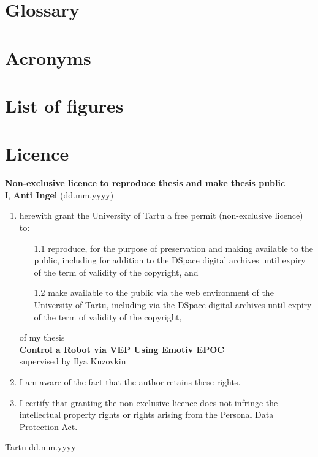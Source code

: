 
\begin{appendices}
\renewcommand{\thesection}{\Roman{section}}
\section{Glossary}
\printglossary
\newpage
\section{Acronyms}
\printglossary[type=\acronymtype]
\newpage
\section{List of figures}
\makeatletter
{}%
\makeatother
\newpage
\section{Licence}
\textbf{Non-exclusive licence to reproduce thesis and make thesis public}\\[1cm]

\noindent I, \textbf{Anti Ingel} (dd.mm.yyyy)

\begin{enumerate}
	\item herewith grant the University of Tartu a free permit (non-exclusive licence) to:
	\begin{enumerate}
		\item[1.1] reproduce, for the purpose of preservation and making available to the public, including for addition to the DSpace digital archives until expiry of the term of validity of the copyright, and
		\item[1.2] make available to the public via the web environment of the University of Tartu, including via the DSpace digital archives until expiry of the term of validity of the copyright,
	\end{enumerate}
	of my thesis\\
	\textbf{Control a Robot via VEP Using Emotiv EPOC}\\
	supervised by Ilya Kuzovkin
	\item I am aware of the fact that the author retains these rights.
	\item I certify that granting the non-exclusive licence does not infringe the intellectual property rights or rights arising from the Personal Data Protection Act.
\end{enumerate}
\vspace{1cm}
Tartu dd.mm.yyyy


\end{appendices}